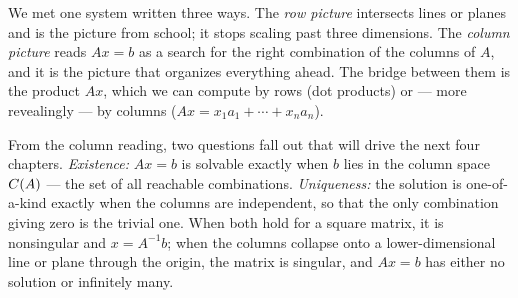 We met one system written three ways. The \emph{row picture} intersects lines or planes and is the picture from school; it stops scaling past three dimensions. The \emph{column picture} reads $Ax=b$ as a search for the right combination of the columns of $A$, and it is the picture that organizes everything ahead. The bridge between them is the product $Ax$, which we can compute by rows (dot products) or --- more revealingly --- by columns ($Ax=x_1a_1+\cdots+x_na_n$).

From the column reading, two questions fall out that will drive the next four chapters. \emph{Existence:} $Ax=b$ is solvable exactly when $b$ lies in the column space $C(A)$ --- the set of all reachable combinations. \emph{Uniqueness:} the solution is one-of-a-kind exactly when the columns are independent, so that the only combination giving zero is the trivial one. When both hold for a square matrix, it is nonsingular and $x=A^{-1}b$; when the columns collapse onto a lower-dimensional line or plane through the origin, the matrix is singular, and $Ax=b$ has either no solution or infinitely many.

